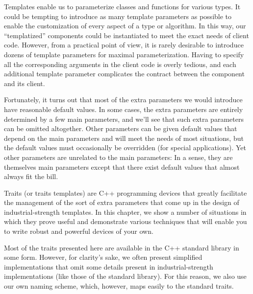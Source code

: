 Templates enable us to parameterize classes and functions for various types. It could be tempting to introduce as many template parameters as possible to enable the customization of every aspect of a type or algorithm. In this way, our “templatized” components could be instantiated to meet the exact needs of client code. However, from a practical point of view, it is rarely desirable to introduce dozens of template parameters for maximal parameterization. Having to specify all the corresponding arguments in the client code is overly tedious, and each additional template parameter complicates the contract between the component and its client.

Fortunately, it turns out that most of the extra parameters we would introduce have reasonable default values. In some cases, the extra parameters are entirely determined by a few main parameters, and we’ll see that such extra parameters can be omitted altogether. Other parameters can be given default values that depend on the main parameters and will meet the needs of most situations, but the default values must occasionally be overridden (for special applications). Yet other parameters are unrelated to the main parameters: In a sense, they are themselves main parameters except that there exist default values that almost always fit the bill.

Traits (or traits templates) are C++ programming devices that greatly facilitate the management of the sort of extra parameters that come up in the design of industrial-strength templates. In this chapter, we show a number of situations in which they prove useful and demonstrate various techniques that will enable you to write robust and powerful devices of your own.

Most of the traits presented here are available in the C++ standard library in some form. However, for clarity’s sake, we often present simplified implementations that omit some details present in industrial-strength implementations (like those of the standard library). For this reason, we also use our own naming scheme, which, however, maps easily to the standard traits.